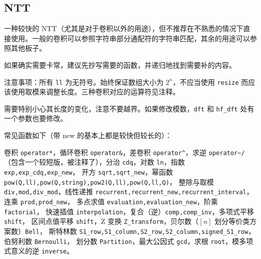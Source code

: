 \documentclass[12pt]{ctexart}
\begin{document}
\subsection{NTT}

一种较快的 NTT（尤其是对于卷积以外的用途），但不推荐在不熟悉的情况下直接使用。一般的卷积可以参照字符串部分通配符的字符串匹配，其余的用途可以参照其他板子。

如果确实需要卡常，建议先抄写需要的函数，并递归地找到需要补的内容。

注意事项：所有 \verb|ll| 为无符号。始终保证数组大小为 $2^n$，不应当使用 \verb|resize| 而应该使用取模来调整长度。三种卷积对应的运算符见注释。

需要特别小心其长度的变化，注意不要越界。如果修改模数，\verb|dft| 和 \verb|hf_dft| 处有一个参数也要修改。

常见函数如下（带 new 的基本上都是较快但较长的）：

卷积 \verb|operator*|，循环卷积 \verb|operator&|，差卷积 \verb|operator^|，求逆 \verb|operator~/|
（包含一个较短版，被注释了），分治 \verb|cdq|，对数 \verb|ln|，指数 \verb|exp,exp_cdq,exp_new|，
开方 \verb|sqrt,sqrt_new|，幂函数 \verb|pow(Q,ll),pow(Q,string),pow2(Q,ll),pow(Q,ll,Q)|，
整除与取模 \verb|div,mod,div_mod|，线性递推 \verb|recurrent,recurrent_new,recurrent_interval|，
连乘 \verb|prod,prod_new|，\newline
多点求值 \verb|evaluation,evaluation_new|，阶乘 \verb|factorial|，
快速插值 \verb|interpolation|，复合（逆）\verb|comp,comp_inv|，多项式平移 \verb|shift|，
区间点值平移 \verb|shift|，Z 变换 \verb|Z_transform|，贝尔数（$[n]$ 划分等价类方案数）\verb|Bell|，
斯特林数 \verb|S1_row,S1_column,S2_row,S2_column,signed_S1_row|，伯努利数 \verb|Bernoulli|，
划分数 \verb|Partition|，最大公因式 \verb|gcd|，求根 \verb|root|，模多项式意义的逆 \verb|inverse|。
\end{document}
